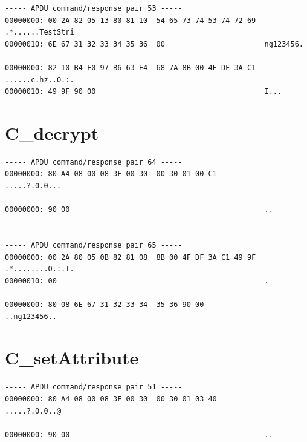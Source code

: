 \documentclass[bsc,frontabs,twoside,singlespacing,parskip,deptreport]{infthesis}     %
\begin{document}
\begin{appendices}
\begin{Verbatim}[commandchars=\\\{\}, fontsize=\small]
----- APDU command/response pair 53 -----
00000000: 00 2A 82 05 13 80 81 10  54 65 73 74 53 74 72 69  .*......TestStri
00000010: 6E 67 31 32 33 34 35 36  00                       ng123456.

00000000: 82 10 B4 F0 97 B6 63 E4  68 7A 8B 00 4F DF 3A C1  ......c.hz..O.:.
00000010: 49 9F 90 00                                       I...
\end{Verbatim}

\section{C\_decrypt}
\begin{Verbatim}[commandchars=\\\{\}, fontsize=\small]
----- APDU command/response pair 64 -----
00000000: 80 A4 08 00 08 3F 00 30  00 30 01 00 C1           .....?.0.0...

00000000: 90 00                                             ..


----- APDU command/response pair 65 -----
00000000: 00 2A 80 05 0B 82 81 08  8B 00 4F DF 3A C1 49 9F  .*........O.:.I.
00000010: 00                                                .

00000000: 80 08 6E 67 31 32 33 34  35 36 90 00              ..ng123456..
\end{Verbatim}


\section{C\_setAttribute}
\begin{Verbatim}[commandchars=\\\{\}, fontsize=\small]
----- APDU command/response pair 51 -----
00000000: 80 A4 08 00 08 3F 00 30  00 30 01 03 40           .....?.0.0..@

00000000: 90 00                                             ..



\end{Verbatim}
\end{appendices}
\end{document}
